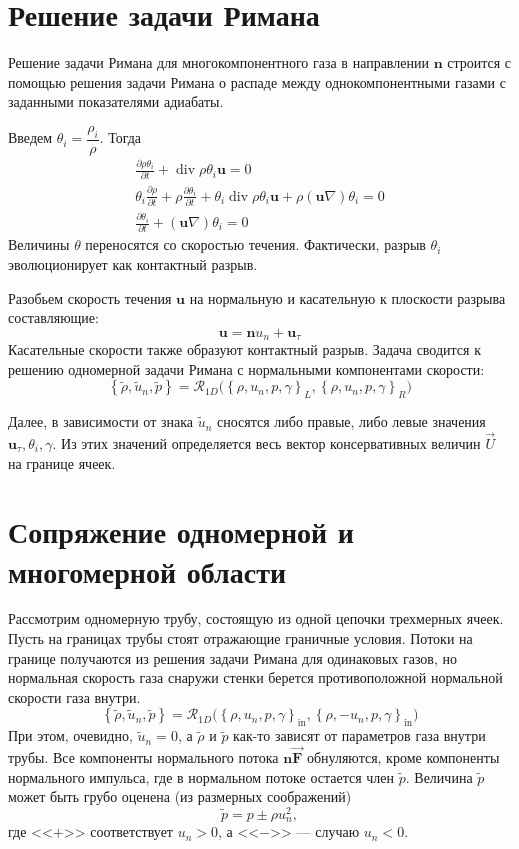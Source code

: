 \documentclass[12pt]{article}
\newcommand{\pd}[2]{\frac{\partial #1}{\partial #2}}
\renewcommand{\div}{\operatorname{div}}
\newcommand{\bvec}[1]{\boldsymbol{\mathbf{#1}}}
\begin{document}
\section{Решение задачи Римана}
Решение задачи Римана для многокомпонентного газа в направлении $\bvec{n}$ строится с помощью решения задачи 
Римана о распаде между однокомпонентными газами с заданными показателями адиабаты.

Введем $\theta_i = \dfrac{\rho_i}{\rho}$. Тогда
\begin{gather*}
\pd{\rho \theta_i}{t} + \div \rho \theta_i \bvec{u} = 0\\
\theta_i\pd{\rho}{t} + \rho \pd{\theta_i}{t} + \theta_i \div \rho \theta_i \bvec{u} + 
\rho (\bvec{u} \nabla) \theta_i = 0\\
\pd{\theta_i}{t} + (\bvec{u} \nabla) \theta_i = 0
\end{gather*}
Величины $\theta$ переносятся со скоростью течения. Фактически, разрыв $\theta_i$ эволюционирует как контактный разрыв.

Разобьем скорость течения $\bvec{u}$ на нормальную и касательную к плоскости разрыва составляющие:
\[
\bvec u = \bvec n u_n + \bvec{u}_{\tau}
\]
Касательные скорости также образуют контактный разрыв. Задача сводится к решению одномерной задачи Римана с нормальными 
компонентами скорости:
\[
\left\{
\tilde\rho, \tilde{u}_n, \tilde p
\right\} = 
\mathcal{R}_{1D}\Big(
\left\{
\rho, u_n, p, \gamma
\right\}_L
,
\left\{
\rho, u_n, p, \gamma
\right\}_R
\Big)
\]

Далее, в зависимости от знака $\tilde{u}_n$ сносятся либо правые, либо левые значения $\bvec{u}_{\tau}, \theta_i, \gamma$. Из этих значений определяется весь вектор консервативных величин $\vec{U}$ на границе ячеек.

\section{Сопряжение одномерной и многомерной области}

Рассмотрим одномерную трубу, состоящую из одной цепочки трехмерных ячеек. Пусть на границах трубы стоят отражающие 
граничные условия. Потоки на границе получаются из решения задачи Римана для одинаковых газов, но нормальная 
скорость газа снаружи стенки берется противоположной нормальной скорости газа внутри.
\[
\left\{
\tilde\rho, \tilde{u}_n, \tilde p
\right\} = 
\mathcal{R}_{1D}\Big(
\left\{
\rho, u_n, p, \gamma
\right\}_\text{in}
,
\left\{
\rho, -u_n, p, \gamma
\right\}_\text{in}
\Big)
\]
При этом, очевидно, $\tilde{u}_n = 0$, а $\tilde{\rho}$ и $\tilde{p}$ как-то зависят от параметров газа внутри 
трубы. Все компоненты нормального потока $\bvec{n}\vec{\bvec{F}}$ обнуляются, кроме компоненты нормального импульса, 
где в нормальном потоке остается член $\tilde{p}$. Величина $\tilde{p}$ может быть грубо оценена (из размерных соображений)
\[
\tilde{p} = p \pm \rho u_n^2,
\]
где <<$+$>> соответствует $u_n > 0$, а <<$-$>> --- случаю $u_n < 0$.
\end{document}
